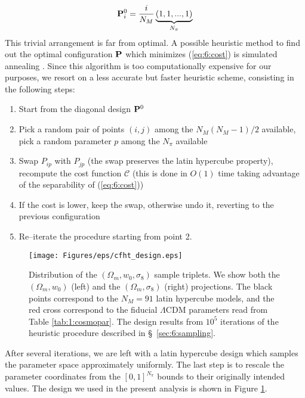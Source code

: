 \begin{equation}
\label{eq:6:diagonal}
\mathbf{P}^0_{i} = \frac{i}{N_M}\underbrace{(1,1,...,1)}_{N_\pi}
\end{equation}
%  
This trivial arrangement is far from optimal. A possible heuristic method to find out the optimal configuration $\mathbf{P}$ which minimizes (\ref{eq:6:cost}) is simulated annealing \citep{Skiena}. Since this algorithm is too computationally expensive for our purposes, we resort on a less accurate but faster heuristic scheme, consisting in the following steps: 
\begin{enumerate}
\item Start from the diagonal design $\mathbf{P}^0$
\item Pick a random pair of points $(i,j)$ among the $N_M(N_M-1)/2$ available, pick a random parameter $p$ among the $N_\pi$ available
\item Swap $P_{ip}$ with $P_{jp}$ (the swap preserves the latin hypercube property), recompute the cost function $\mathcal{C}$ (this is done in $O(1)$ time taking advantage of the separability of (\ref{eq:6:cost}))
\item If the cost is lower, keep the swap, otherwise undo it, reverting to the previous configuration
\item Re--iterate the procedure starting from point 2. 
\end{enumerate}
%
\begin{figure}
\begin{center}
\texttt{[image: Figures/eps/cfht\_design.eps]}
\end{center}
\caption{Distribution of the $(\Omega_m,w_0,\sigma_8)$ sample triplets. We show both the $(\Omega_m,w_0)$ (left) and the $(\Omega_m,\sigma_8)$ (right) projections. The black points correspond to the $N_M=91$ latin hypercube models, and the red cross correspond to the fiducial $\Lambda$CDM parameters read from Table \ref{tab:1:cosmopar}. The design results from $10^5$ iterations of the heuristic procedure described in \S~\ref{sec:6:sampling}.}
\label{fig:6:sampling}
\end{figure}
%
After several iterations, we are left with a latin hypercube design which samples the parameter space approximately uniformly. The last step is to rescale the parameter coordinates from the $[0,1]^{N_\pi}$ bounds to their originally intended values. The design we used in the present analysis is shown in Figure \ref{fig:6:sampling}. 

